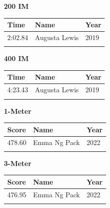 \hfill
\begin{minipage}[t]{0.48\textwidth}
\centering
\textbf{\textcolor{teamprimary}{200 IM}}\par
\vspace{0.5em}
\centering
\small
\renewcommand{\arraystretch}{1.0}
\setlength{\tabcolsep}{4pt}
\begin{tabular}{@{}p{1.8cm}p{3.0cm}p{1.0cm}@{}}
\toprule
\textbf{Time} & \textbf{Name} & \textbf{Year} \\
\midrule
2:02.84 & Augusta Lewis & 2019 \\
\bottomrule
\vspace{0.5em}
\end{tabular}
\end{minipage}
\vspace{1.2em}
\noindent\begin{minipage}[t]{0.48\textwidth}
\centering
\textbf{\textcolor{teamprimary}{400 IM}}\par
\vspace{0.5em}
\centering
\small
\renewcommand{\arraystretch}{1.0}
\setlength{\tabcolsep}{4pt}
\begin{tabular}{@{}p{1.8cm}p{3.0cm}p{1.0cm}@{}}
\toprule
\textbf{Time} & \textbf{Name} & \textbf{Year} \\
\midrule
4:23.43 & Augusta Lewis & 2019 \\
\bottomrule
\vspace{0.5em}
\end{tabular}
\end{minipage}
\hfill
\begin{minipage}[t]{0.48\textwidth}
\centering
\textbf{\textcolor{teamprimary}{1-Meter}}\par
\vspace{0.5em}
\centering
\small
\renewcommand{\arraystretch}{1.0}
\setlength{\tabcolsep}{4pt}
\begin{tabular}{@{}p{1.8cm}p{3.0cm}p{1.0cm}@{}}
\toprule
\textbf{Score} & \textbf{Name} & \textbf{Year} \\
\midrule
478.60 & Emma Ng Pack & 2022 \\
\bottomrule
\vspace{0.5em}
\end{tabular}
\end{minipage}
\vspace{1.2em}
\noindent\begin{minipage}[t]{0.98\textwidth}
\centering
\textbf{\textcolor{teamprimary}{3-Meter}}\par
\vspace{0.5em}
\centering
\small
\renewcommand{\arraystretch}{1.0}
\setlength{\tabcolsep}{4pt}
\begin{tabular}{@{}p{1.8cm}p{3.0cm}p{1.0cm}@{}}
\toprule
\textbf{Score} & \textbf{Name} & \textbf{Year} \\
\midrule
476.95 & Emma Ng Pack & 2022 \\
\bottomrule
\vspace{0.5em}
\end{tabular}
\end{minipage}
\clearpage
